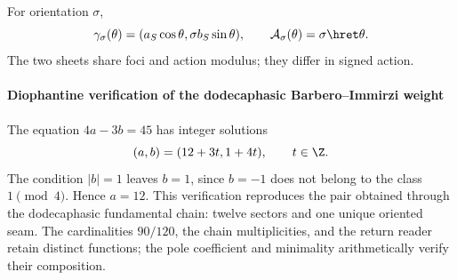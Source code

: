 For orientation \(\sigma\),
\[
\gamma_\sigma(\theta)
=(a_S\cos\theta,\sigma b_S\sin\theta),
\qquad
\mathcal A_\sigma(\theta)=\sigma\hret\theta.
\]
The two sheets share foci and action modulus; they differ in signed action.

\paragraph{Diophantine verification of the dodecaphasic Barbero--Immirzi weight}

The equation \(4a-3b=45\) has integer solutions
\[
(a,b)=(12+3t,1+4t),\qquad t\in\Z.
\]
The condition \(|b|=1\) leaves \(b=1\), since \(b=-1\) does not belong to the class
\(1\pmod4\). Hence \(a=12\). This verification reproduces the pair obtained through the dodecaphasic
fundamental chain: twelve sectors and one unique oriented seam. The cardinalities
\(90/120\), the chain multiplicities, and the return reader
retain distinct functions; the pole coefficient and minimality
arithmetically verify their composition.
